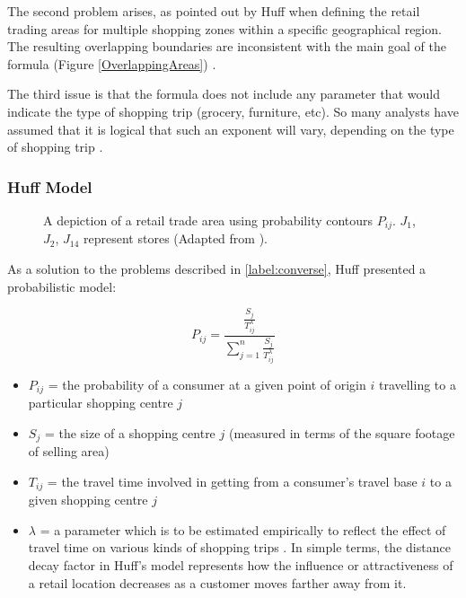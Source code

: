 The second problem arises, as pointed out by Huff when defining the retail trading areas for multiple shopping zones within a specific geographical region. The resulting overlapping boundaries are inconsistent with the main goal of the formula (Figure \ref{OverlappingAreas}) \cite{huff1964defining}.

The third issue is that the formula does not include any parameter that would indicate the type of shopping trip (grocery, furniture, etc). So many analysts have assumed that it is logical that such an exponent will vary, depending on the type of shopping trip \cite{huff1964defining}.

\subsubsection{Huff Model}
\label{section:huff-model}

\begin{figure}[ht]
	\centering
	
	\caption{A depiction of a retail trade area using probability contours $P_{ij}$. $J_1$, $J_2$, $J_{14}$ represent stores (Adapted from \cite{huff1964defining}).}
	\label{fig:huff}
\end{figure}

As a solution to the problems described in \ref{label:converse}, Huff presented a probabilistic model:

\begin{equation}
P_{ij}=\frac{ \frac{S_j}{T_{ij}^\lambda} }{ \sum_{j=1}^{n} \frac{S_j}{T_{ij}^\lambda} }
\label{HuffEquation}
\end{equation}

\begin{itemize}
    \item{$P_{ij}$ = the probability of a consumer at a given point of origin $i$ travelling to a particular shopping centre $j$}
    \item{$S_j$ = the size of a shopping centre $j$ (measured in terms of the square footage of selling area)}
    \item{$T_{ij}$ = the travel time involved in getting from a consumer's travel base $i$ to a given shopping centre $j$}
    \item{$\lambda$ = a parameter which is to be estimated empirically to reflect the effect of travel time on various kinds of shopping trips \cite{huff1964defining}. In simple terms, the distance decay factor in Huff's model represents how the influence or attractiveness of a retail location decreases as a customer moves farther away from it.}
\end{itemize}

